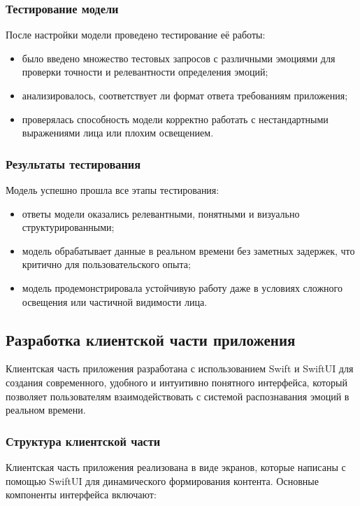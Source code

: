 {{\subsubsection*{Тестирование модели}
После настройки модели проведено тестирование её работы:
\begin{itemize}
    \item было введено множество тестовых запросов с различными эмоциями для проверки точности и релевантности определения эмоций;
    \item анализировалось, соответствует ли формат ответа требованиям приложения;
    \item проверялась способность модели корректно работать с нестандартными выражениями лица или плохим освещением.
\end{itemize}

\subsubsection*{Результаты тестирования}
Модель успешно прошла все этапы тестирования:
\begin{itemize}
    \item ответы модели оказались релевантными, понятными и визуально структурированными;
    \item модель обрабатывает данные в реальном времени без заметных задержек, что критично для пользовательского опыта;
    \item модель продемонстрировала устойчивую работу даже в условиях сложного освещения или частичной видимости лица.
\end{itemize}

}
\newpage

\subsection{Разработка клиентской части приложения}
{
    Клиентская часть приложения разработана с использованием Swift и SwiftUI для создания современного, удобного и интуитивно понятного интерфейса, который позволяет пользователям взаимодействовать с системой распознавания эмоций в реальном времени.

    \subsubsection*{Структура клиентской части}
    
    Клиентская часть приложения реализована в виде экранов, которые написаны с помощью SwiftUI для динамического формирования контента. Основные компоненты интерфейса включают:
    
}}
